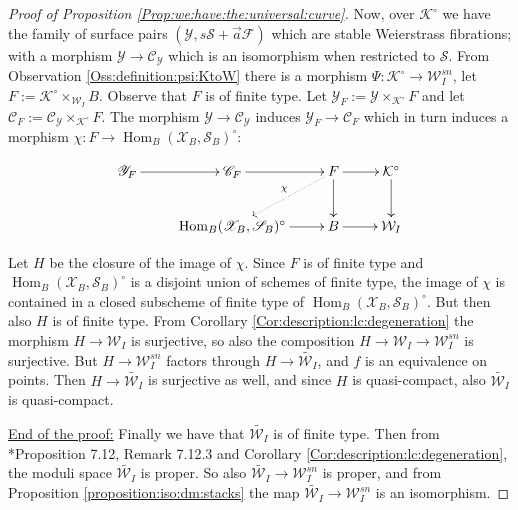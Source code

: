 \documentclass[11pt]{amsart}
\newcommand{\cE}{\mathcal{W}}
\newcommand{\sC}{\mathscr{C}}
\newcommand{\sF}{\mathscr{F}}
\newcommand{\sS}{\mathscr{S}}
\newcommand{\sX}{\mathscr{X}}
\newcommand{\Kg}{\mathcal{K}}
\newcommand{\sY}{\mathscr{Y}}
\theoremstyle{definition}
\begin{document}
\begin{proof}[Proof of Proposition \ref{Prop:we:have:the:universal:curve}]
Now, over $\Kg^\circ$ we have the family of surface pairs $(\sY,s\sS+\vec{a}\sF)$ which are stable Weierstrass fibrations; with a morphism $\sY \to \sC_\sY$ which is an isomorphism when restricted to $\sS$. From Observation \ref{Oss:definition:psi:KtoW} there is a morphism $\Psi:\Kg^\circ \to \cE_I^{sn}$, let $F:= \Kg^\circ \times_{\cE_I}B$. Observe that $F$ is of finite type. Let $\sY_F:=\sY \times_{\Kg^\circ} F$ and let $\sC_F:=\sC_\sY \times_{\Kg^\circ}F$. The morphism $\sY \to \sC_\sY$ induces $\sY_F \to \sC_F$ which in turn induces a morphism $\chi:F \to \operatorname{Hom}_B(\sX_B,\sS_B)^\circ$:

$$\xymatrix{\sY_F \ar[r]& \sC_F \ar[r] & F \ar[r] \ar[d] \ar@{.>}[ld]_-{\chi} & \Kg^\circ \ar[d] \\ &\operatorname{Hom}_B(\sX_B,\sS_B)^\circ \ar[r]& B \ar[r] & \cE_I}$$

Let $H$ be the closure of the image of $\chi$. Since $F$ is of finite type and $\operatorname{Hom}_B(\sX_B,\sS_B)^\circ$ is a disjoint union of schemes of finite type, the image of $\chi$ is contained in a closed subscheme of finite type of $\operatorname{Hom}_B(\sX_B,\sS_B)^\circ$. But then also $H$ is of finite type. From Corollary \ref{Cor:description:lc:degeneration} the morphism $H \to \cE_I$ is surjective, so also the composition $H \to \cE_I \to \cE_I^{sn}$ is surjective. But $H \to \cE_I^{sn}$ factors through $H \to \widetilde{\cE_I}$, and $f$ is an equivalence on points. Then
$H \to \widetilde{\cE_I}$ is surjective as well, and since $H$ is quasi-compact, also $\widetilde{\cE_I}$ is quasi-compact.

\underline{End of the proof:} Finally we have that $\widetilde{\cE_I}$ is of finite type. Then from \cite{LMB}*{Proposition 7.12, Remark 7.12.3}
and Corollary \ref{Cor:description:lc:degeneration}, the moduli space $\widetilde{\cE_I}$
is proper. So also $\widetilde{\cE_I} \to \cE_{I}^{sn}$ is proper, and from
Proposition \ref{proposition:iso:dm:stacks} the map $\widetilde{\cE_I}\to \cE_I^{sn}$ is an isomorphism.
\end{proof}
\end{document}
